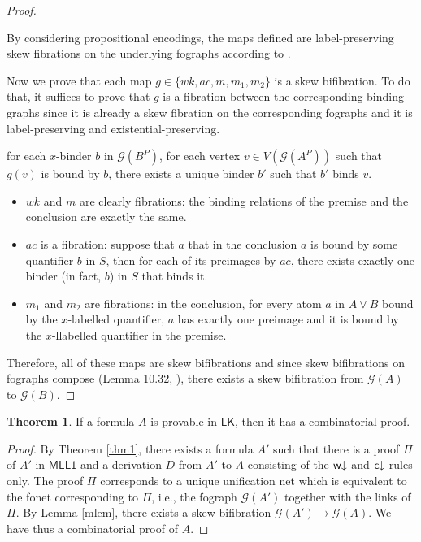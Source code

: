 \documentclass[conference]{IEEEtran}
\theoremstyle{definition}
\newtheorem{theorem_}[thm]{Theorem}
\newcommand*{\LK}{\mathsf{LK}}
\newcommand*{\FOMLL}{\mathsf{MLL1}}
\newcommand{\Gr}{\mathcal{G}}
\newcommand{\PE}[1]{#1^P}
\begin{document}
\begin{proof}
\begin{itemize}
\end{itemize}

By considering propositional encodings, the maps defined are label-preserving skew fibrations on the underlying fographs according to \cite{Strassburger 2007}.

Now we prove that each map $g \in \{wk, ac, m, m_1, m_2 \}$ is a skew bifibration. To do that, it suffices to prove that $g$ is a fibration between the corresponding binding graphs since it is already a skew fibration on the corresponding fographs and it is label-preserving and existential-preserving.
\begin{center}
for each $x$-binder $b$ in $\Gr(\PE{B})$, for each vertex $v \in V(\Gr(\PE{A}))$
such that $g(v)$ is bound by $b$, there exists a unique binder $b'$ such
that $b'$ binds $v$.
\end{center}

\begin{itemize}
  \item $wk$ and $m$ are clearly fibrations: the binding relations of the premise and the conclusion are exactly the same.
  \item $ac$ is a fibration: suppose that $a$ that in the conclusion $a$ is bound by some quantifier $b$ in $S$, then for each of its preimages by $ac$, there exists exactly one binder (in fact, $b$) in $S$ that binds it.
  \item $m_1$ and $m_2$ are fibrations: in the conclusion, for every atom $a$ in $A \vee B$ bound by the $x$-labelled quantifier, $a$ has exactly one preimage and it is bound by the $x$-llabelled quantifier in the premise.
\end{itemize}

  Therefore, all of these maps are skew bifibrations and since skew bifibrations
on fographs compose (Lemma 10.32, \cite{Hughes 2019}), there exists a skew
bifibration from $\Gr(A)$ to $\Gr(B)$.

\end{proof}

\begin{theorem_}
If a formula $A$ is provable in $\LK$, then it has a combinatorial proof.
\end{theorem_}

\begin{proof}
By Theorem \ref{thm1}, there exists a formula $A'$ such that there is a proof
$\Pi$ of $A'$ in $\FOMLL$ and a derivation $D$ from $A'$ to $A$ consisting of
the ${\mathsf w}{\downarrow}$ and ${\mathsf c}{\downarrow}$ rules only. The proof $\Pi$ corresponds to a unique
unification net which is equivalent to the fonet corresponding to $\Pi$, i.e.,
the fograph $\Gr(A')$ together with the links of $\Pi$. By Lemma \ref{mlem}, 
there exists a skew bifibration $\Gr(A') \rightarrow \Gr(A)$. We have thus a
combinatorial proof of $A$.

\end{proof}
\end{document}
